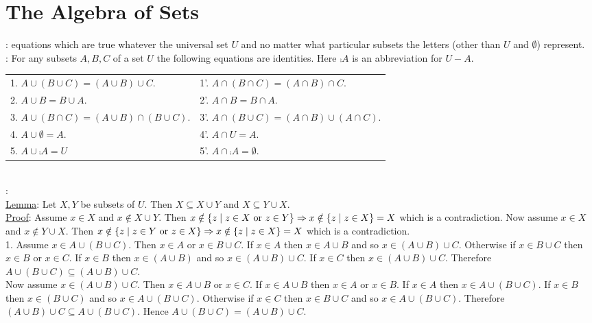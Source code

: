 \documentclass[12pt]{book}
\begin{document}
\section{The Algebra of Sets}
: equations which are true whatever the universal set $U$ and no matter what particular subsets the letters (other than $U$ and $\emptyset$) represent.\\ \linebreak
{}: For any subsets $A, B, C$ of a set $U$ the following equations are identities. Here $\comp{A}$ is an abbreviation for $U - A$.\\
\begin{tabular}{ll}
1. $A \cup (B \cup C) = (A \cup B) \cup C$.& 1'. $A \cap (B \cap C) = (A \cap B) \cap C$.\\
2. $A \cup B = B \cup A$.& 2'. $A \cap B = B \cap A$.\\
3. $A \cup (B \cap C) = (A \cup B) \cap (B \cup C)$.& 3'. $A \cap (B \cup C) = (A \cap B) \cup (A \cap C)$.\\
4. $A \cup \emptyset = A$.& 4'. $A \cap U = A$.\\
5. $A \cup \comp{A} = U$& 5'. $A \cap \comp{A} = \emptyset$.
\end{tabular}\\
:\\
\small \underline{Lemma}: Let $X,Y$ be subsets of $U$. Then $X \subseteq X \cup Y$ and $X \subseteq Y \cup X$.\\ \underline{Proof}: Assume $x \in X$ and $x \notin X \cup Y$. Then $x \notin \{z \mid z \in X \text{ or } z \in Y\} \Rightarrow x \notin \{z \mid z \in X\} = X$ which is a contradiction. Now assume $x \in X$ and $x \notin Y \cup X$. Then $x \notin \{z \mid z \in Y \text{ or } z \in X\} \Rightarrow x \notin \{z \mid z \in X\} = X$ which is a contradiction.\\ \normalsize
1. Assume $x \in A \cup (B \cup C)$. Then $x \in A$ or $x \in B \cup C$. If $x \in A$ then $x \in A \cup B$ and so $x \in (A \cup B) \cup C$. Otherwise if $x \in B \cup C$ then $x \in B$ or $x \in C$. If $x \in B$ then $x \in (A \cup B)$ and so $x \in (A \cup B) \cup C$. If $x \in C$ then $x \in (A \cup B) \cup C$. Therefore $A \cup (B \cup C) \subseteq (A \cup B) \cup C$.\\ Now assume $x \in (A \cup B) \cup C$. Then $x \in A \cup B$ or $x \in C$. If $x \in A \cup B$ then $x \in A$ or $x \in B$. If $x \in A$ then $x \in A \cup (B \cup C)$. If $x \in B$ then $x \in (B \cup C)$ and so $x \in A \cup (B \cup C)$. Otherwise if $x \in C$ then $x \in B \cup C$ and so $x \in A \cup (B \cup C)$. Therefore $(A \cup B) \cup C \subseteq A \cup (B \cup C)$. Hence $A \cup (B \cup C) = (A \cup B) \cup C$.\\
\end{document}
